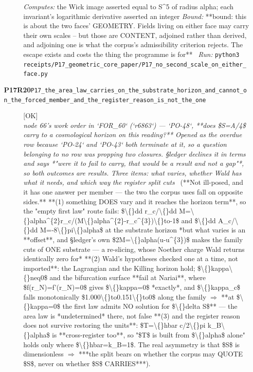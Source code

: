 \begin{description}
\emph{Computes:} the Wick image asserted equal to S\textasciicircum{}5 of radius alpha; each invariant's logarithmic derivative asserted an integer
 \emph{Bound:} **bound: this is about the two faces' GEOMETRY. Fields living on either face may carry their own scales -- but those are CONTENT, adjoined rather than derived, and adjoining one is what the corpus's admissibility criterion rejects. The escape exists and costs the thing the programme is for**
\ \emph{Run:} \texttt{python3 receipts/P17\_geometric\_core\_paper/P17\_no\_second\_scale\_on\_either\_face.py}
\item[\rcptlabel{P17_the_area_law_carries_on_the_substrate_horizon_and_cannot_on_the_forced_member_and_the_register_reason_is_not_the_one}{P17R20}\textbf{P17R20}\quad\texttt{P17\_the\_area\_law\_carries\_on\_the\_substrate\_horizon\_and\_cannot\_on\_the\_forced\_member\_and\_the\_register\_reason\_is\_not\_the\_one}]\hfill\textsf{[OK]}\\
\textit{node 66's work order in `FOR\_60` (`r6863`) --- `PO-48`, **does \$S=A/4\$ carry to a cosmological horizon on this reading?** Opened as the overdue row because `PO-24` and `PO-43` both terminate at it, so a question belonging to no row was propping two closures. \S{}ledger declines it in terms and says *"were it to fail to carry, that would be a result and not a gap"*, so both outcomes are results. Three items: what varies, whether Wald has what it needs, and which way the register split cuts} \ (**Not ill-posed, and it has one answer per member --- the two the corpus uses fall on opposite sides.**  **(1) something DOES vary and it reaches the horizon term**, so the "empty first law" route fails: \$\textbackslash\{\}dd r\_c/\textbackslash\{\}dd M=\textbackslash\{\}alpha\textasciicircum{}\{2\}r\_c/(M\textbackslash\{\}alpha\textasciicircum{}\{2\}-r\_c\textasciicircum{}\{3\})\textbackslash\{\}to-1\$ and \$\textbackslash\{\}dd A\_c/\textbackslash\{\}dd M=-8\textbackslash\{\}pi\textbackslash\{\}alpha\$ at the substrate horizon  *but what varies is an **offset**, and \S{}ledger's own \$2M=\textbackslash\{\}alpha(u-u\textasciicircum{}\{3\})\$ makes the family cuts of ONE substrate --- a re-slicing, whose Noether charge Wald returns identically zero for*  **(2) Wald's hypotheses checked one at a time, not imported**: the Lagrangian and the Killing horizon hold; \$\textbackslash\{\}kappa\textbackslash\{\}neq0\$ and the bifurcation surface **fail at Nariai**, where \$f(r\_N)=f'(r\_N)=0\$ gives \$\textbackslash\{\}kappa=0\$ *exactly*, and \$\textbackslash\{\}kappa\_c\$ falls monotonically \$1.000\textbackslash\{\}to0.151\textbackslash\{\}to0\$ along the family \ensuremath{\Rightarrow}  **at \$\textbackslash\{\}kappa=0\$ the first law admits NO solution for \$\textbackslash\{\}delta S\$** --- the area law is *undetermined* there, not false   **(3) and the register reason does not survive restoring the units**: \$T=\textbackslash\{\}hbar c/2\textbackslash\{\}pi k\_B\textbackslash\{\}alpha\$ is **cross-register too**, so "\$T\$ is built from \$\textbackslash\{\}alpha\$ alone" holds only where \$\textbackslash\{\}hbar=k\_B=1\$. The real asymmetry is that \$S\$ is dimensionless \ensuremath{\Rightarrow} ***the split bears on whether the corpus may QUOTE \$S\$, never on whether \$S\$ CARRIES***). 

\end{description}
